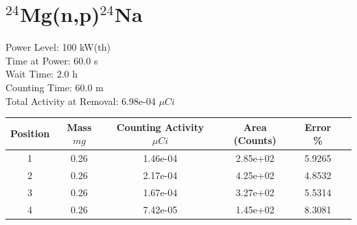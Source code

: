 \newpage

\section*{ $^{24}$Mg(n,p)$^{24}$Na }

Power Level: 100 kW(th) \\
Time at Power: 60.0 s \\
Wait Time:  2.0 h \\
Counting Time: 60.0 m \\
Total Activity at Removal: 6.98e-04 $\mu Ci$

\begin{table}[h]
\centering
\begin{tabular}{ |c|c|c|c|c|c| }
 \hline
 Position & Mass $mg$ & Counting Activity $\mu Ci$ & Area (Counts) & Error \% \\
 \hline 
 1 & 0.26 & 1.46e-04 & 2.85e+02 & 5.9265 \\ 
\hline
 2 & 0.26 & 2.17e-04 & 4.25e+02 & 4.8532 \\ 
\hline
 3 & 0.26 & 1.67e-04 & 3.27e+02 & 5.5314 \\ 
\hline
 4 & 0.26 & 7.42e-05 & 1.45e+02 & 8.3081 \\ 
\hline
\end{tabular}
\end{table}

